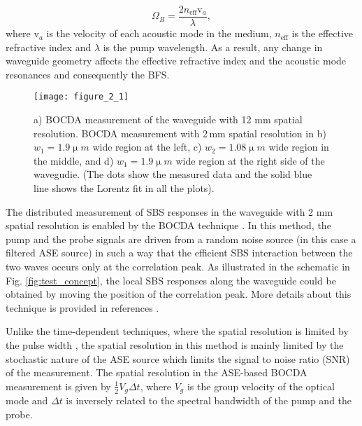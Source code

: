 \documentclass[superscriptaddress, nofootinbib, twocolumn, amsmath,amssymb, aps, pra, notitlepage, longbibliography]{revtex4-1}
\begin{document}
\begin{equation}
\Omega _{B}=\frac{2n_\mathrm{eff}\mathrm{v}_{a}}{\lambda }, 
\label{eq:delta nu}
\end{equation}
where $\mathrm{v} _{a}$ is the velocity of each acoustic mode in the medium, $n_\mathrm{eff}$ is the effective refractive index and $\lambda$ is the pump wavelength. As a result, any change in waveguide geometry affects the effective refractive index and the acoustic mode resonances \cite{Chow2018} and consequently the BFS.  



\begin{figure*}[t]    
\centering
\texttt{[image: figure\_2\_1]}
\caption{a) BOCDA measurement of the waveguide with 12 mm spatial resolution. BOCDA measurement with 2\,mm spatial resolution in  b) $w_{1} = 1.9 \upmu m$ wide region at the left,  c) $ w_{2} = 1.08 \upmu m$ wide region in the middle, and  d) $ w_{1} = 1.9 \upmu m$ wide region at the right side of the wavegudie. (The dots show the measured data and the solid blue line shows the Lorentz fit in all the plots).}
\label{fig:experiment}
\end{figure*}

The distributed measurement of SBS responses in the waveguide with 2 mm spatial resolution is enabled by the BOCDA technique \cite{Song2006}. In this method, the pump and the probe signals are driven from a random noise source (in this case a filtered ASE source) in such a way that the efficient SBS interaction between the two waves occurs only at the correlation peak. As illustrated in the schematic in Fig. \ref{fig:test_concept}, the local SBS responses along the waveguide could be obtained by moving the position of the correlation peak. More details about this technique is provided in references \cite{Cohen2014a,Zarifi2017}.

Unlike the time-dependent techniques, where the spatial resolution is limited by the pulse width \cite{Fellay1997}, the spatial resolution in this method is mainly limited by the stochastic nature of the ASE source which limits the signal to noise ratio (SNR) of the measurement. The spatial resolution in the ASE-based BOCDA measurement is given by $\frac{1}{2}V_{g}\Delta t$, where $V_{g}$ is the group velocity of the optical mode and $\Delta t$ is inversely related to the spectral bandwidth of the pump and the probe.
\end{document}
